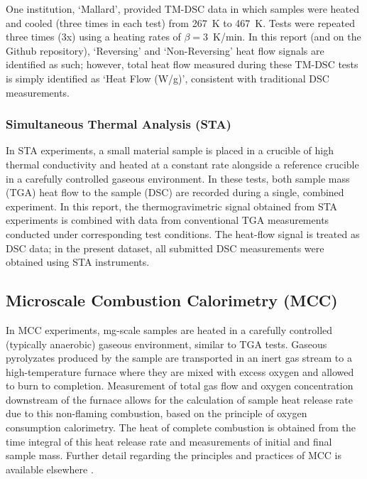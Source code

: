 \documentclass{book}
\begin{document}
One institution, ‘Mallard’, provided TM-DSC data in which samples were heated and cooled (three times in each test) from 267~K to 467~K. Tests were repeated three times (3x) using a heating rates of $\beta=3$~K/min. In this report (and on the Github repository), `Reversing' and `Non-Reversing' heat flow signals are identified as such; however, total heat flow measured during these TM-DSC tests is simply identified as `Heat Flow (W/g)', consistent with traditional DSC measurements.

\subsubsection*{Simultaneous Thermal Analysis (STA)}
In STA experiments, a small material sample is placed in a crucible of high thermal conductivity and heated at a constant rate alongside a reference crucible in a carefully controlled gaseous environment. In these tests, both sample mass (TGA) heat flow to the sample (DSC) are recorded during a single, combined experiment. In this report, the thermogravimetric signal obtained from STA experiments is combined with data from conventional TGA measurements conducted under corresponding test conditions. The heat-flow signal is treated as DSC data; in the present dataset, all submitted DSC measurements were obtained using STA instruments.

\subsection{Microscale Combustion Calorimetry (MCC)}
In MCC experiments, mg-scale samples are heated in a carefully controlled (typically anaerobic) gaseous environment, similar to TGA tests. Gaseous pyrolyzates produced by the sample are transported in an inert gas stream to a high-temperature furnace where they are mixed with excess oxygen and allowed to burn to completion. Measurement of total gas flow and oxygen concentration downstream of the furnace allows for the calculation of sample heat release rate due to this non-flaming combustion, based on the principle of oxygen consumption calorimetry. The heat of complete combustion is obtained from the time integral of this heat release rate and measurements of initial and final sample mass. Further detail regarding the principles and practices of MCC is available elsewhere \cite{lyon2013principles}.
\end{document}
